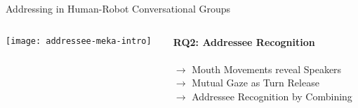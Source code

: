 \begin{frame}{Addressing in Human-Robot Conversational Groups}
  \centering
    \begin{columns}[T] %
      \begin{column}{.5\textwidth}
         \texttt{[image: addressee-meka-intro]}
      \end{column}
      \begin{column}{.5\textwidth}
        \vspace{10pt}
        \textbf{RQ2: Addressee Recognition}\\\vspace{5pt} 
         \\
      \vspace{10pt}
        \footnotesize
       \(\rightarrow\) \hspace{5pt} Mouth Movements reveal Speakers\\
       \vspace{10pt}
       \(\rightarrow\) \hspace{5pt} Mutual Gaze as Turn Release\\
       \vspace{10pt}
       \(\rightarrow\) \hspace{5pt} Addressee Recognition by Combining\\
      \end{column}
    \end{columns}
\end{frame}
